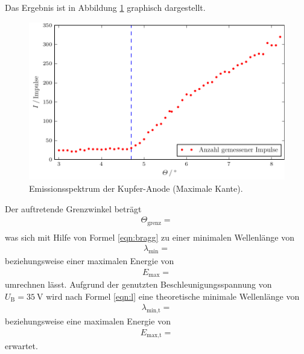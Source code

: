 Das Ergebnis ist in Abbildung \ref{fig:plot3} graphisch dargestellt.
\begin{figure}
  \centering
  \includegraphics{build/plot_3.pdf}
  \caption{Emissionsspektrum der Kupfer-Anode (Maximale Kante).}
  \label{fig:plot3}
\end{figure}
Der auftretende Grenzwinkel beträgt
\begin{align*}
  \Theta_{\text{grenz}} =  \\
\end{align*}
was sich mit Hilfe von Formel \eqref{eqn:bragg} zu einer minimalen Wellenlänge von
\begin{align*}
  \lambda_{\text{min}} = 
\end{align*}
beziehungsweise einer maximalen Energie von
\begin{align*}
  E_{\text{max}} = 
\end{align*}
umrechnen lässt.
Aufgrund der genutzten Beschleunigungsspannung von $U_\text{B} = \SI{35}{\volt}$ wird nach Formel \eqref{eqn:l} eine theoretische minimale Wellenlänge von
\begin{align*}
  \lambda_{\text{min,t}} = 
\end{align*}
beziehungsweise eine maximalen Energie von
\begin{align*}
  E_{\text{max,t}} = 
\end{align*}
erwartet.
